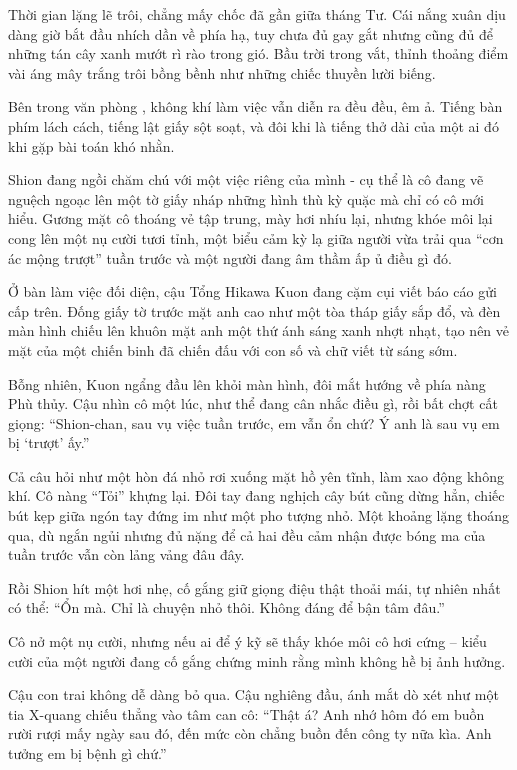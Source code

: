 \documentclass[../main.tex]{subfiles}
\begin{document}
Thời gian lặng lẽ trôi, chẳng mấy chốc đã gần giữa tháng Tư. Cái nắng xuân dịu dàng giờ bắt đầu nhích dần về phía hạ, tuy chưa đủ gay gắt nhưng cũng đủ để những tán cây xanh mướt rì rào trong gió. Bầu trời trong vắt, thỉnh thoảng điểm vài áng mây trắng trôi bồng bềnh như những chiếc thuyền lười biếng.

Bên trong văn phòng \hll, không khí làm việc vẫn diễn ra đều đều, êm ả. Tiếng bàn phím lách cách, tiếng lật giấy sột soạt, và đôi khi là tiếng thở dài của một ai đó khi gặp bài toán khó nhằn.

Shion đang ngồi chăm chú với một việc riêng của mình - cụ thể là cô đang vẽ nguệch ngoạc lên một tờ giấy nháp những hình thù kỳ quặc mà chỉ có cô mới hiểu. Gương mặt cô thoáng vẻ tập trung, mày hơi nhíu lại, nhưng khóe môi lại cong lên một nụ cười tươi tỉnh, một biểu cảm kỳ lạ giữa người vừa trải qua ``cơn ác mộng trượt'' tuần trước và một người đang âm thầm ấp ủ điều gì đó.

Ở bàn làm việc đối diện, cậu Tổng Hikawa Kuon đang cặm cụi viết báo cáo gửi cấp trên. Đống giấy tờ trước mặt anh cao như một tòa tháp giấy sắp đổ, và đèn màn hình chiếu lên khuôn mặt anh một thứ ánh sáng xanh nhợt nhạt, tạo nên vẻ mặt của một chiến binh đã chiến đấu với con số và chữ viết từ sáng sớm.

Bỗng nhiên, Kuon ngẩng đầu lên khỏi màn hình, đôi mắt hướng về phía nàng Phù thủy. Cậu nhìn cô một lúc, như thể đang cân nhắc điều gì, rồi bất chợt cất giọng: ``Shion-chan, sau vụ việc tuần trước, em vẫn ổn chứ? Ý anh là sau vụ em bị `trượt' ấy.''

Cả câu hỏi như một hòn đá nhỏ rơi xuống mặt hồ yên tĩnh, làm xao động không khí. Cô nàng ``Tỏi'' khựng lại. Đôi tay đang nghịch cây bút cũng dừng hẳn, chiếc bút kẹp giữa ngón tay đứng im như một pho tượng nhỏ. Một khoảng lặng thoáng qua, dù ngắn ngủi nhưng đủ nặng để cả hai đều cảm nhận được bóng ma của tuần trước vẫn còn lảng vảng đâu đây.

Rồi Shion hít một hơi nhẹ, cố gắng giữ giọng điệu thật thoải mái, tự nhiên nhất có thể: ``Ổn mà. Chỉ là chuyện nhỏ thôi. Không đáng để bận tâm đâu.''

Cô nở một nụ cười, nhưng nếu ai để ý kỹ sẽ thấy khóe môi cô hơi cứng – kiểu cười của một người đang cố gắng chứng minh rằng mình không hề bị ảnh hưởng.

Cậu con trai không dễ dàng bỏ qua. Cậu nghiêng đầu, ánh mắt dò xét như một tia X-quang chiếu thẳng vào tâm can cô: ``Thật á? Anh nhớ hôm đó em buồn rười rượi mấy ngày sau đó, đến mức còn chẳng buồn đến công ty nữa kìa. Anh tưởng em bị bệnh gì chứ.''
\end{document}
